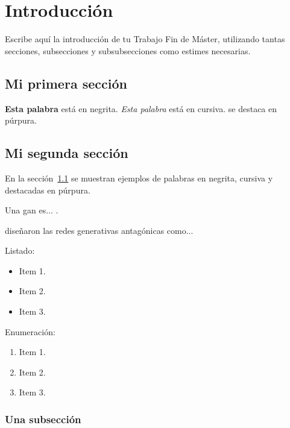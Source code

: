 
\cleardoublepage

\chapter{Introducción}
\label{introduccion}

Escribe aquí la introducción de tu Trabajo Fin de Máster, utilizando tantas secciones, subsecciones y subsubsecciones como estimes necesarias.

\section{Mi primera sección}
\label{mi-primera-seccion}

\textbf{Esta palabra} está en negrita. \textit{Esta palabra} está en cursiva.  se destaca en púrpura.
\medskip

\section{Mi segunda sección}
\label{mi-segunda-seccion}

En la sección~\ref{mi-primera-seccion} se muestran ejemplos de palabras en negrita, cursiva y destacadas en púrpura.
\medskip

Una \acrfull{gan} es... \citep{goodfellow2014generative}.
\medskip

\citet{goodfellow2014generative} diseñaron las redes generativas antagónicas como...
\medskip

\vspace{5ex}

Listado:
\begin{itemize}
  \item Item 1.
  \item Item 2.
  \item Item 3.
\end{itemize}

Enumeración:
\begin{enumerate}
  \item Item 1.
  \item Item 2.
  \item Item 3.
\end{enumerate}

\subsection{Una subsección}
\label{una-subseccion}

